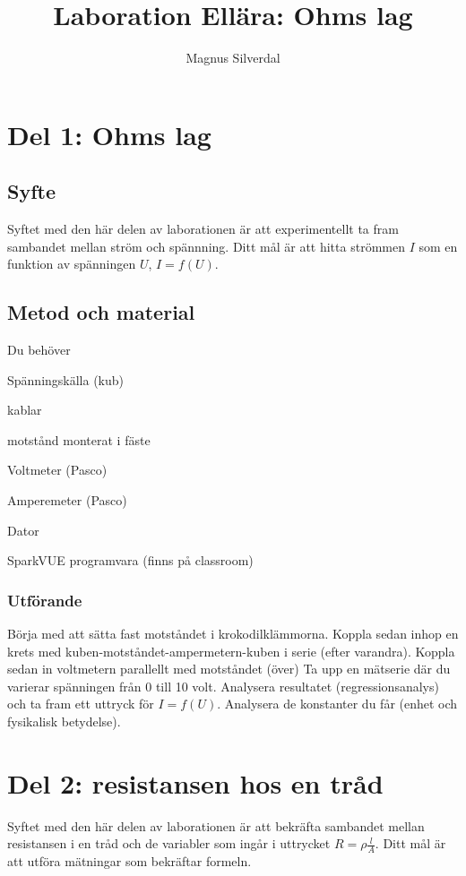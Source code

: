 \documentclass[11pt]{article}
\title{Laboration Ellära: Ohms lag}
\author{Magnus Silverdal}
\begin{document}
    \maketitle
    \section{Del 1: Ohms lag}
    \subsection{Syfte}
    Syftet med den här delen av laborationen är att experimentellt ta fram sambandet mellan ström och spännning.
    Ditt mål är att hitta strömmen $I$ som en funktion av spänningen $U$, $I = f(U)$.
    \subsection{Metod och material}
    Du behöver
    \begin{enumeration}
        \item Spänningskälla (kub)
        \item kablar
        \item motstånd monterat i fäste
        \item Voltmeter (Pasco)
        \item Amperemeter (Pasco)
        \item Dator
        \item SparkVUE programvara (finns på classroom)
    \end{enumeration}
    \subsubsection{Utförande}
    Börja med att sätta fast motståndet i krokodilklämmorna. Koppla sedan inhop en krets med
    kuben-motståndet-ampermetern-kuben i serie (efter varandra). Koppla sedan in voltmetern parallellt med motståndet (över)
    Ta upp en mätserie där du varierar spänningen från 0 till 10 volt. Analysera resultatet (regressionsanalys) och ta fram ett uttryck för
    $I = f(U)$. Analysera de konstanter du får (enhet och fysikalisk betydelse).

    \section{Del 2: resistansen hos en tråd}
    Syftet med den här delen av laborationen är att bekräfta sambandet mellan resistansen i en tråd och de variabler som
    ingår i uttrycket $R = \rho \frac{l}{A}$.
    Ditt mål är att utföra mätningar som bekräftar formeln.
\end{document}
